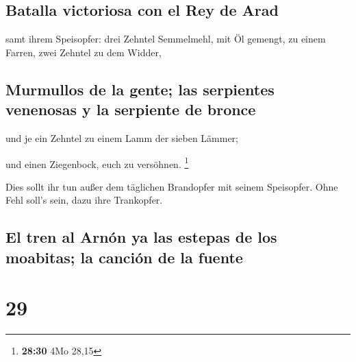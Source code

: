 \hypertarget{batalla-victoriosa-con-el-rey-de-arad}{%
\subsection{Batalla victoriosa con el Rey de
Arad}\label{batalla-victoriosa-con-el-rey-de-arad}}

 samt ihrem Speisopfer: drei Zehntel Semmelmehl, mit Öl
gemengt, zu einem Farren, zwei Zehntel zu dem Widder,

\hypertarget{murmullos-de-la-gente-las-serpientes-venenosas-y-la-serpiente-de-bronce}{%
\subsection{Murmullos de la gente; las serpientes venenosas y la
serpiente de
bronce}\label{murmullos-de-la-gente-las-serpientes-venenosas-y-la-serpiente-de-bronce}}

 und je ein Zehntel zu einem Lamm der sieben Lämmer;

 und einen Ziegenbock, euch zu versöhnen. \footnote{\textbf{28:30}
  4Mo 28,15}

 Dies sollt ihr tun außer dem täglichen Brandopfer mit
seinem Speisopfer. Ohne Fehl soll's sein, dazu ihre Trankopfer.

\hypertarget{el-tren-al-arnuxf3n-ya-las-estepas-de-los-moabitas-la-canciuxf3n-de-la-fuente}{%
\subsection{El tren al Arnón ya las estepas de los moabitas; la canción
de la
fuente}\label{el-tren-al-arnuxf3n-ya-las-estepas-de-los-moabitas-la-canciuxf3n-de-la-fuente}}

\hypertarget{section-28}{%
\section{29}\label{section-28}}

